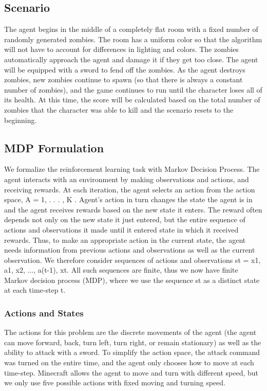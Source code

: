 \documentclass{article}
\begin{document}
\begin{multicols}{2}
\subsection{Scenario}

The agent begins in the middle of a completely flat room with a fixed number of randomly generated zombies. The room has a uniform color so that the algorithm will not have to account for differences in lighting and colors. The zombies automatically approach the agent and damage it if they get too close. The agent will be equipped with a sword to fend off the zombies. As the agent destroys zombies, new zombies continue to spawn (so that there is always a constant number of zombies), and the game continues to run until the character loses all of its health. At this time, the score will be calculated based on the total number of zombies that the character was able to kill and the scenario resets to the beginning.


\subsection{MDP Formulation}
 
We formalize the reinforcement learning task with Markov Decision Process. The agent interacts with an environment by making observations and actions, and receiving rewards. At each iteration, the agent selects an action from the action space, A = {1, . . . , K }. Agent's action in turn changes the state the agent is in and the agent receives rewards based on the new state it enters. The reward often depends not only on the new state it just entered, but the entire sequence of actions and observations it made until it entered state in which it received rewards. Thus, to make an appropriate action in the current state, the agent needs information from previous actions and observations as well as the current observation. We therefore consider sequences of actions and observations st = x1, a1, x2, ..., a(t-1), xt. All such sequences are finite, thus we now have finite Markov decision process (MDP), where we use the sequence st as a distinct state at each time-step t.

\subsubsection{Actions and States}

The actions for this problem are the discrete movements of the agent (the agent can move forward, back, turn left, turn right, or remain stationary) as well as the ability to attack with a sword. To simplify the action space, the attack command was turned on the entire time, and the agent only chooses how to move at each time-step. Minecraft allows the agent to move and turn with different speed, but we only use five possible actions with fixed moving and turning speed.


\end{multicols}
\end{document}
